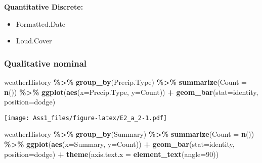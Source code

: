 \documentclass[
]{article}
\newenvironment{Shaded}{\begin{snugshade}}{\end{snugshade}}
\newcommand{\AttributeTok}[1]{\textcolor[rgb]{0.13,0.29,0.53}{#1}}
\newcommand{\DecValTok}[1]{\textcolor[rgb]{0.00,0.00,0.81}{#1}}
\newcommand{\FunctionTok}[1]{\textcolor[rgb]{0.13,0.29,0.53}{\textbf{#1}}}
\newcommand{\NormalTok}[1]{#1}
\newcommand{\SpecialCharTok}[1]{\textcolor[rgb]{0.81,0.36,0.00}{\textbf{#1}}}
\newcommand{\StringTok}[1]{\textcolor[rgb]{0.31,0.60,0.02}{#1}}
\providecommand{\tightlist}{%
  \setlength{\itemsep}{0pt}\setlength{\parskip}{0pt}}
\begin{document}
\textbf{Quantitative Discrete:}

\begin{itemize}
\tightlist
\item
  Formatted.Date
\item
  Loud.Cover
\end{itemize}

\subsubsection{Qualitative nominal}\label{qualitative-nominal}

\begin{Shaded}
\begin{Highlighting}[]
\NormalTok{weatherHistory }\SpecialCharTok{\%\textgreater{}\%}
  \FunctionTok{group\_by}\NormalTok{(Precip.Type) }\SpecialCharTok{\%\textgreater{}\%}
  \FunctionTok{summarize}\NormalTok{(}\AttributeTok{Count =} \FunctionTok{n}\NormalTok{()) }\SpecialCharTok{\%\textgreater{}\%}
  \FunctionTok{ggplot}\NormalTok{(}\FunctionTok{aes}\NormalTok{(}\AttributeTok{x=}\NormalTok{Precip.Type, }\AttributeTok{y=}\NormalTok{Count)) }\SpecialCharTok{+}
  \FunctionTok{geom\_bar}\NormalTok{(}\AttributeTok{stat=}\StringTok{\textquotesingle{}identity\textquotesingle{}}\NormalTok{, }\AttributeTok{position=}\StringTok{\textquotesingle{}dodge\textquotesingle{}}\NormalTok{)}
\end{Highlighting}
\end{Shaded}

\texttt{[image: Ass1\_files/figure-latex/E2\_a\_2-1.pdf]}

\begin{Shaded}
\begin{Highlighting}[]
\NormalTok{weatherHistory }\SpecialCharTok{\%\textgreater{}\%}
  \FunctionTok{group\_by}\NormalTok{(Summary) }\SpecialCharTok{\%\textgreater{}\%}
  \FunctionTok{summarize}\NormalTok{(}\AttributeTok{Count =} \FunctionTok{n}\NormalTok{()) }\SpecialCharTok{\%\textgreater{}\%}
  \FunctionTok{ggplot}\NormalTok{(}\FunctionTok{aes}\NormalTok{(}\AttributeTok{x=}\NormalTok{Summary, }\AttributeTok{y=}\NormalTok{Count)) }\SpecialCharTok{+}
  \FunctionTok{geom\_bar}\NormalTok{(}\AttributeTok{stat=}\StringTok{\textquotesingle{}identity\textquotesingle{}}\NormalTok{, }\AttributeTok{position=}\StringTok{\textquotesingle{}dodge\textquotesingle{}}\NormalTok{) }\SpecialCharTok{+}
  \FunctionTok{theme}\NormalTok{(}\AttributeTok{axis.text.x =} \FunctionTok{element\_text}\NormalTok{(}\AttributeTok{angle=}\DecValTok{90}\NormalTok{))}
\end{Highlighting}
\end{Shaded}
\end{document}
